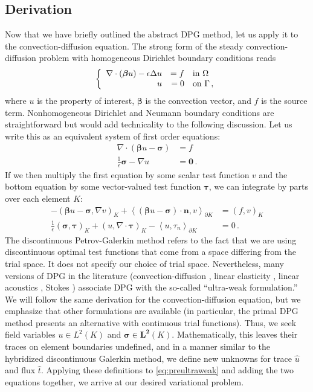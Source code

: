 \documentclass[letterpaper]{article}
\def\btau{\boldsymbol\tau}
\def\bfsigma{\boldsymbol\sigma}
\def\bbeta{\boldsymbol\beta}
\newcommand{\bs}[1]{\boldsymbol{#1}}
\newcommand{\eqnref}[1]{\eqref{eq:#1}}
\newcommand{\mb}[1]{\mathbf{#1}}
\newcommand{\LRa}[1]{\left\langle #1 \right\rangle}
\newcommand{\del}{\Delta}
\newcommand{\grad}{\nabla}
\renewcommand{\div}{\grad \cdot}
\begin{document}
\subsection{Derivation}
Now that we have briefly outlined the abstract DPG method, let us apply it to
the convection-diffusion equation. The strong form of the steady
convection-diffusion problem with homogeneous Dirichlet boundary conditions reads
\[
\left\{
\begin{array}[c]{rrl}
\div(\bs\beta u)-\epsilon\del u & =f & \text{in }\Omega\\
u & =0 & \text{on }\Gamma\,,
\end{array}
\right.
\]
where $u$ is the property of interest, $\bs\beta$ is the convection vector,
and $f$ is the source term. Nonhomogeneous Dirichlet and Neumann boundary
conditions are straightforward but would add technicality to the following
discussion. Let us write this as an equivalent system of first
order equations:
\begin{align*}
\div(\bs\beta u-\bs\sigma)&=f\\
\frac{1}{\epsilon}\bs\sigma-\grad u&=\bs0\,.
\end{align*}
If we then multiply the first equation by some scalar test function $v$ and the
bottom equation by some vector-valued test function $\btau$, we can integrate by
parts over each element $K$:
\begin{equation}
\label{eq:preultraweak}
\begin{aligned}
-(\bbeta u-\bfsigma,\nabla v)_K+\LRa{(\bbeta
u-\bfsigma)\cdot\mathbf{n},v}_{\partial K}&=(f,v)_K\\
\frac{1}{\epsilon}(\bfsigma,\btau)_K+(u,\nabla\cdot\btau)_K
-\LRa{u,\tau_n}_{\partial K}&=0\,.
\end{aligned}
\end{equation}
The discontinuous Petrov-Galerkin method refers to the fact that we are using
discontinuous optimal test functions that come from a space differing from the
trial space. It does not specify our choice of trial space. Nevertheless, many
versions of DPG in the literature (convection-diffusion \cite{DPG6},
linear elasticity \cite{BramwellDemkowiczGopalakrishnanQiu11}, linear
acoustics \cite{DemkowiczGopalakrishnanMugaZitelli12}, Stokes
\cite{DPGStokes}) associate DPG with the so-called ``ultra-weak formulation.''
We will follow the same derivation for the convection-diffusion equation, but
we emphasize that other formulations are available (in particular, the
primal DPG\cite{PrimalDPG} method presents an alternative with
continuous trial functions). Thus, we seek field variables $u\in L^2(K)$ and
$\bfsigma\in\mb{L^2}(K)$. Mathematically, this leaves their traces on element
boundaries undefined, and in a manner similar to the hybridized discontinuous
Galerkin method, we define new unknowns for trace $\hat u$ and flux $\hat t$.
Applying these definitions to \eqnref{preultraweak} and adding the two
equations together, we arrive at our desired variational problem.
\end{document}
